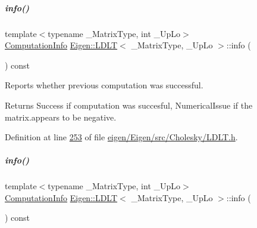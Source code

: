 \mbox{\label{group___cholesky___module_a6bd6008501a537d2e16ea672a853bf3e}} 
\subparagraph{\texorpdfstring{info()}{info()}\hspace{0.1cm}{\footnotesize\ttfamily [1/2]}}
{\footnotesize\ttfamily template$<$typename \+\_\+\+Matrix\+Type, int \+\_\+\+Up\+Lo$>$ \\
\hyperlink{group__enums_ga85fad7b87587764e5cf6b513a9e0ee5e}{Computation\+Info} \hyperlink{group___cholesky___module_class_eigen_1_1_l_d_l_t}{Eigen\+::\+L\+D\+LT}$<$ \+\_\+\+Matrix\+Type, \+\_\+\+Up\+Lo $>$\+::info (\begin{DoxyParamCaption}{ }\end{DoxyParamCaption}) const\hspace{0.3cm}{\ttfamily [inline]}}



Reports whether previous computation was successful. 

\begin{DoxyReturn}{Returns}
{\ttfamily Success} if computation was succesful, {\ttfamily Numerical\+Issue} if the matrix.\+appears to be negative. 
\end{DoxyReturn}


Definition at line \hyperlink{eigen_2_eigen_2src_2_cholesky_2_l_d_l_t_8h_source_l00253}{253} of file \hyperlink{eigen_2_eigen_2src_2_cholesky_2_l_d_l_t_8h_source}{eigen/\+Eigen/src/\+Cholesky/\+L\+D\+L\+T.\+h}.

\mbox{\label{group___cholesky___module_a6bd6008501a537d2e16ea672a853bf3e}} 
\subparagraph{\texorpdfstring{info()}{info()}\hspace{0.1cm}{\footnotesize\ttfamily [2/2]}}
{\footnotesize\ttfamily template$<$typename \+\_\+\+Matrix\+Type, int \+\_\+\+Up\+Lo$>$ \\
\hyperlink{group__enums_ga85fad7b87587764e5cf6b513a9e0ee5e}{Computation\+Info} \hyperlink{group___cholesky___module_class_eigen_1_1_l_d_l_t}{Eigen\+::\+L\+D\+LT}$<$ \+\_\+\+Matrix\+Type, \+\_\+\+Up\+Lo $>$\+::info (\begin{DoxyParamCaption}{ }\end{DoxyParamCaption}) const\hspace{0.3cm}{\ttfamily [inline]}}



